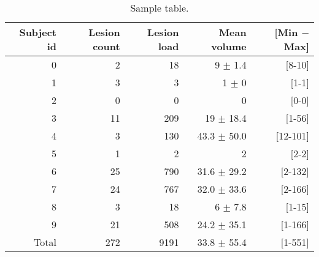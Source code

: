 \begin{table}[!htb]
  \centering
  \begin{tabular*}{1.0\textwidth}{@{\extracolsep{\fill}} rrrrr}
    \textbf{Subject id} & \textbf{Lesion count} & \textbf{Lesion load} & \textbf{Mean volume} & \textbf{[Min $-$ Max]} \\
    \toprule
    \midrule
    0 & 2 & 18 & 9 $\pm$ 1.4 & [8-10] \\
    1 & 3 & 3 & 1 $\pm$ 0 & [1-1] \\
    2 & 0 & 0 & 0 & [0-0] \\
    3 & 11 & 209 & 19 $\pm$ 18.4 & [1-56] \\
    4 & 3 & 130 & 43.3 $\pm$ 50.0 & [12-101] \\
    5 & 1 & 2 & 2 & [2-2] \\
    6 & 25 & 790 & 31.6 $\pm$ 29.2 & [2-132] \\
    7 & 24 & 767 & 32.0 $\pm$ 33.6 & [2-166] \\
    8 & 3 & 18 & 6 $\pm$ 7.8 & [1-15] \\
    9 & 21 & 508 & 24.2 $\pm$ 35.1 & [1-166] \\
    \midrule
    Total & 272 & 9191 & 33.8 $\pm$ 55.4 & [1-551] \\
    \midrule
    \bottomrule
  \end{tabular*}
\label{table:trainingData}
\caption{Sample table.
         }
\end{table}

